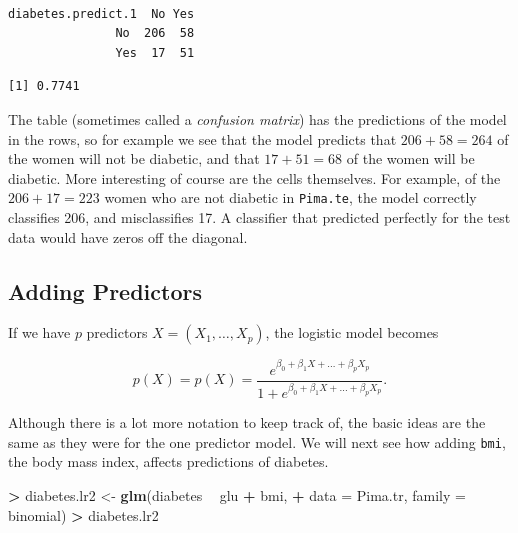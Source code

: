 \documentclass[]{krantz}
\makeatletter
\newenvironment{Shaded}{\begin{snugshade}}{\end{snugshade}}
\newcommand{\KeywordTok}[1]{\textcolor[rgb]{0.27,0.27,0.27}{\textbf{#1}}}
\newcommand{\DataTypeTok}[1]{\textcolor[rgb]{0.27,0.27,0.27}{#1}}
\newcommand{\DecValTok}[1]{\textcolor[rgb]{0.06,0.06,0.06}{#1}}
\newcommand{\StringTok}[1]{\textcolor[rgb]{0.5,0.5,0.5}{#1}}
\newcommand{\OperatorTok}[1]{\textcolor[rgb]{0.43,0.43,0.43}{\textbf{#1}}}
\newcommand{\NormalTok}[1]{#1}
\newenvironment{kframe}{%
\medskip{}
\setlength{\fboxsep}{.8em}
 \def\at@end@of@kframe{}%
 \ifinner\ifhmode%
  \def\at@end@of@kframe{\end{minipage}}%
  \begin{minipage}{\columnwidth}%
 \fi\fi%
 \def\FrameCommand##1{\hskip\@totalleftmargin \hskip-\fboxsep
 \colorbox{shadecolor}{##1}\hskip-\fboxsep
     \hskip-\linewidth \hskip-\@totalleftmargin \hskip\columnwidth}%
 \MakeFramed {\advance\hsize-\width
   \@totalleftmargin\z@ \linewidth\hsize
   \@setminipage}}%
 {\par\unskip\endMakeFramed%
 \at@end@of@kframe}
\renewenvironment{Shaded}{\begin{kframe}}{\end{kframe}}
\makeatother
\begin{document}
\begin{verbatim}
                  
diabetes.predict.1  No Yes
               No  206  58
               Yes  17  51
\end{verbatim}

\begin{Shaded}
\end{Shaded}

\begin{verbatim}
[1] 0.7741
\end{verbatim}

The table (sometimes called a \emph{confusion matrix}) has the
predictions of the model in the rows, so for example we see that the
model predicts that \(206 + 58 = 264\) of the women will not be
diabetic, and that \(17+51 = 68\) of the women will be diabetic. More
interesting of course are the cells themselves. For example, of the
\(206 + 17 = 223\) women who are not diabetic in \texttt{Pima.te}, the
model correctly classifies 206, and misclassifies 17. A classifier that
predicted perfectly for the test data would have zeros off the diagonal.

\subsection{Adding Predictors}\label{adding-predictors}

If we have \(p\) predictors \(X = (X_1, \dots, X_p)\), the logistic
model becomes

\[
p(X) = p(X) = \frac{e^{\beta_0 + \beta_1 X + \dots + \beta_p X_p}}{1 + e^{\beta_0 + \beta_1 X + \dots + \beta_p X_p}}.
\]

Although there is a lot more notation to keep track of, the basic ideas
are the same as they were for the one predictor model. We will next see
how adding \texttt{bmi}, the body mass index, affects predictions of
diabetes.

\begin{Shaded}
\begin{Highlighting}[]
\OperatorTok{>}\StringTok{ }\NormalTok{diabetes.lr2 <-}\StringTok{ }\KeywordTok{glm}\NormalTok{(diabetes }\OperatorTok{~}\StringTok{ }\NormalTok{glu }\OperatorTok{+}\StringTok{ }\NormalTok{bmi, }
\OperatorTok{+}\StringTok{                     }\DataTypeTok{data =}\NormalTok{ Pima.tr, }\DataTypeTok{family =}\NormalTok{ binomial)}
\OperatorTok{>}\StringTok{ }\NormalTok{diabetes.lr2}
\end{Highlighting}
\end{Shaded}
\end{document}
